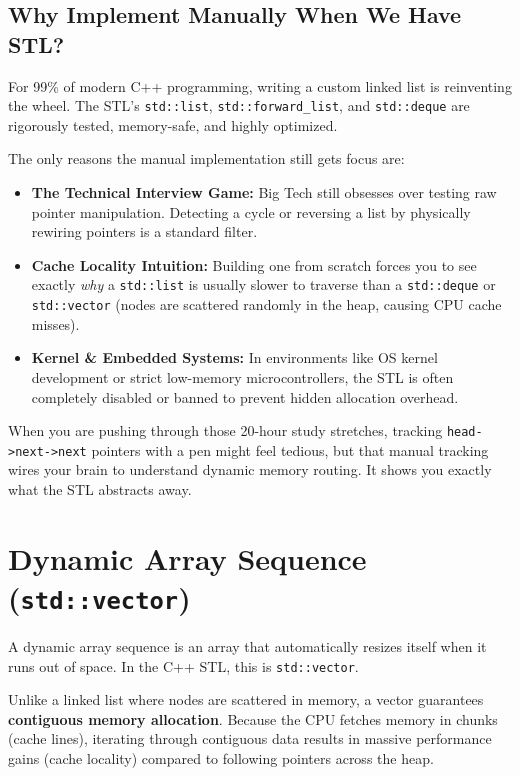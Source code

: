 \documentclass{article}
\begin{document}
\subsection{Why Implement Manually When We Have STL?}
For 99\% of modern C++ programming, writing a custom linked list is reinventing the wheel. The STL’s \texttt{std::list}, \texttt{std::forward\_list}, and \texttt{std::deque} are rigorously tested, memory-safe, and highly optimized. 

The only reasons the manual implementation still gets focus are:
\begin{itemize}
    \item \textbf{The Technical Interview Game:} Big Tech still obsesses over testing raw pointer manipulation. Detecting a cycle or reversing a list by physically rewiring pointers is a standard filter.
    \item \textbf{Cache Locality Intuition:} Building one from scratch forces you to see exactly \textit{why} a \texttt{std::list} is usually slower to traverse than a \texttt{std::deque} or \texttt{std::vector} (nodes are scattered randomly in the heap, causing CPU cache misses).
    \item \textbf{Kernel \& Embedded Systems:} In environments like OS kernel development or strict low-memory microcontrollers, the STL is often completely disabled or banned to prevent hidden allocation overhead.
\end{itemize}

When you are pushing through those 20-hour study stretches, tracking \texttt{head->next->next} pointers with a pen might feel tedious, but that manual tracking wires your brain to understand dynamic memory routing. It shows you exactly what the STL abstracts away.

\section{Dynamic Array Sequence (\texttt{std::vector})}

A dynamic array sequence is an array that automatically resizes itself when it runs out of space. In the C++ STL, this is \texttt{std::vector}.

Unlike a linked list where nodes are scattered in memory, a vector guarantees \textbf{contiguous memory allocation}. Because the CPU fetches memory in chunks (cache lines), iterating through contiguous data results in massive performance gains (cache locality) compared to following pointers across the heap.
\end{document}
